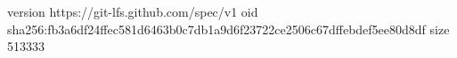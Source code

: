 version https://git-lfs.github.com/spec/v1
oid sha256:fb3a6df24ffec581d6463b0c7db1a9d6f23722ce2506c67dffebdef5ee80d8df
size 513333
